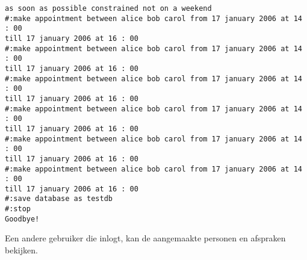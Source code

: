 \documentclass[a4paper]{article}
\begin{document}
\begin{verbatim}
as soon as possible constrained not on a weekend
#:make appointment between alice bob carol from 17 january 2006 at 14 : 00
till 17 january 2006 at 16 : 00
#:make appointment between alice bob carol from 17 january 2006 at 14 : 00 
till 17 january 2006 at 16 : 00
#:make appointment between alice bob carol from 17 january 2006 at 14 : 00 
till 17 january 2006 at 16 : 00
#:make appointment between alice bob carol from 17 january 2006 at 14 : 00 
till 17 january 2006 at 16 : 00
#:make appointment between alice bob carol from 17 january 2006 at 14 : 00 
till 17 january 2006 at 16 : 00
#:make appointment between alice bob carol from 17 january 2006 at 14 : 00 
till 17 january 2006 at 16 : 00
#:save database as testdb
#:stop
Goodbye!
\end{verbatim}

Een andere gebruiker die inlogt, kan de aangemaakte personen en afspraken bekijken.
\end{document}
